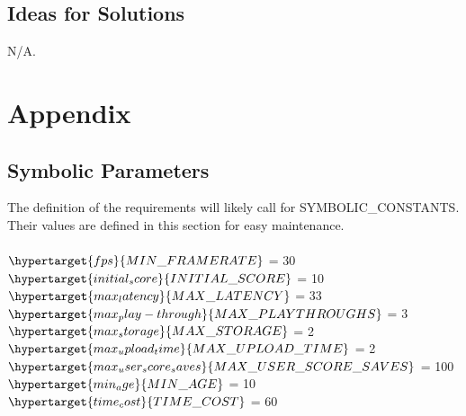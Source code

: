\documentclass[12pt,letterpaper]{article}
\begin{document}
\subsection{Ideas for Solutions}
N/A.

\newpage 

\printbibliography

\newpage

\section{Appendix}


\subsection{Symbolic Parameters}
The definition of the requirements will likely call for SYMBOLIC\_CONSTANTS. Their values are defined in this section for easy maintenance.\\ \\
$\hypertarget{fps}{MIN\_FRAMERATE}$ = 30 \\
$\hypertarget{initial_score}{INITIAL\_SCORE}$ = 10\\
$\hypertarget{max_latency}{MAX\_LATENCY}$ = 33\\
$\hypertarget{max_play-through}{MAX\_PLAYTHROUGHS}$ = 3\\
$\hypertarget{max_storage}{MAX\_STORAGE}$ = 2\\
$\hypertarget{max_upload_time}{MAX\_UPLOAD\_TIME}$ = 2\\
$\hypertarget{max_user_score_saves}{MAX\_USER\_SCORE\_SAVES}$ = 100\\
$\hypertarget{min_age}{MIN\_AGE}$ = 10\\
$\hypertarget{time_cost}{TIME\_COST}$ = 60\\
\end{document}
